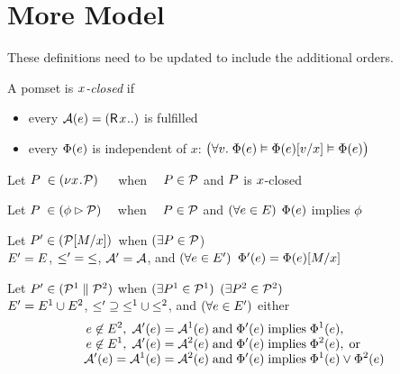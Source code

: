 \section{More Model}
These definitions need to be updated to include the additional orders.
\begin{definition}
  A pomset is \emph{$x$-closed} if
  \begin{itemize}
  \item every $\labelingAct(\aEv)=(\DR{\aLoc}{..})$ is fulfilled
  \item every $\Phi(e)$ is independent of $x$:
    $\bigl(\forall v.\;\Phi(e) \vDash
    \Phi(e)[v/x] \vDash \Phi(e)\bigr)$
  \end{itemize}
\end{definition}

\begin{definition}
  Let $P\phantom{'}\in(\nu x\!\mathbin.\!\mathcal{P}) \mkern22mu$ when
  $\phantom{(\exists}P\in\mathcal{P}$ and $P$ is $x$-closed
\end{definition}
\begin{definition}
  Let $P\phantom{'}\in(\phi \mathbin\rhd \mathcal{P})\mkern16mu$ when
  $\phantom{(\exists}P\in\mathcal{P}$ and $(\forall e\in E)$
  $\Phi(e)$ implies $\phi$
\end{definition}

\begin{definition}
  Let $P'\in(\mathcal{P}[M/x])\mkern2mu$ when $(\exists P\in\mathcal{P}$)\\\qquad
  $E' = E$, ${\le'} = {\le}$, $\mathcal{A}' = \mathcal{A}$, and
  $(\forall e\in E')$ $\Phi'(e) = \Phi(e)[M/x]$
\end{definition}
\begin{definition}
  Let $P' \in (\mathcal{P}^1 \parallel \mathcal{P}^2)$ when
  $(\exists P^1 \in \mathcal{P}^1)$ $(\exists P^2 \in \mathcal{P}^2)$
  \\%
  \qquad $E' = E^1 \cup E^2$,
  ${\le'}\supseteq{\le^1}\cup{\le^2}$, and $(\forall e\in E')$ either
  \begin{gather*}
    \begin{aligned}
      e \not\in E^2,\; \mathcal{A}'(e) &= \mathcal{A}^1(e)
      \;\allowbreak\text{and}\allowbreak\; \Phi'(e) \; \allowbreak\text{implies}\allowbreak\; \Phi^1(e),
      \\[-1ex]
      e \not\in E^1,\; \mathcal{A}'(e) &= \mathcal{A}^2(e)
      \;\allowbreak\text{and}\allowbreak\; \Phi'(e) \; \allowbreak\text{implies}\allowbreak\;
      \Phi^2(e),\; \allowbreak\text{or}\allowbreak\;
      \\[-1ex]
      \mathcal{A}'(e) = \mathcal{A}^1(e) &= \mathcal{A}^2(e)
      \;\allowbreak\text{and}\allowbreak\; \Phi'(e) \; \allowbreak\text{implies}\allowbreak\; \Phi^1(e) \lor
      \Phi^2(e)
    \end{aligned}
  \end{gather*}
\end{definition}

